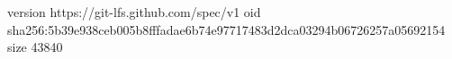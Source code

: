 version https://git-lfs.github.com/spec/v1
oid sha256:5b39e938ceb005b8fffadae6b74e97717483d2dca03294b06726257a05692154
size 43840
